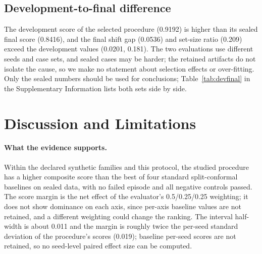 \documentclass{article}
\begin{document}
\subsection{Development-to-final difference}
The development score of the selected procedure (0.9192) is higher than its sealed final score (0.8416), and the final shift gap (0.0536) and set-size ratio (0.209) exceed the development values (0.0201, 0.181). The two evaluations use different seeds and case sets, and sealed cases may be harder; the retained artifacts do not isolate the cause, so we make no statement about selection effects or over-fitting. Only the sealed numbers should be used for conclusions; Table~\ref{tab:devfinal} in the Supplementary Information lists both sets side by side.

\section{Discussion and Limitations}
\paragraph{What the evidence supports.} Within the declared synthetic families and this protocol, the studied procedure has a higher composite score than the best of four standard split-conformal baselines on sealed data, with no failed episode and all negative controls passed. The score margin is the net effect of the evaluator's 0.5/0.25/0.25 weighting; it does not show dominance on each axis, since per-axis baseline values are not retained, and a different weighting could change the ranking. The interval half-width is about 0.011 and the margin is roughly twice the per-seed standard deviation of the procedure's scores (0.019); baseline per-seed scores are not retained, so no seed-level paired effect size can be computed.
\end{document}

